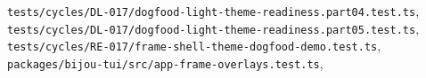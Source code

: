 \begin{itemize}
\texttt{t\allowbreak{}e\allowbreak{}s\allowbreak{}t\allowbreak{}s\allowbreak{}/\allowbreak{}c\allowbreak{}y\allowbreak{}c\allowbreak{}l\allowbreak{}e\allowbreak{}s\allowbreak{}/\allowbreak{}D\allowbreak{}L\allowbreak{}-\allowbreak{}0\allowbreak{}1\allowbreak{}7\allowbreak{}/\allowbreak{}d\allowbreak{}o\allowbreak{}g\allowbreak{}f\allowbreak{}o\allowbreak{}o\allowbreak{}d\allowbreak{}-\allowbreak{}l\allowbreak{}i\allowbreak{}g\allowbreak{}h\allowbreak{}t\allowbreak{}-\allowbreak{}t\allowbreak{}h\allowbreak{}e\allowbreak{}m\allowbreak{}e\allowbreak{}-\allowbreak{}r\allowbreak{}e\allowbreak{}a\allowbreak{}d\allowbreak{}i\allowbreak{}n\allowbreak{}e\allowbreak{}s\allowbreak{}s\allowbreak{}.\allowbreak{}p\allowbreak{}a\allowbreak{}r\allowbreak{}t\allowbreak{}0\allowbreak{}4\allowbreak{}.\allowbreak{}t\allowbreak{}e\allowbreak{}s\allowbreak{}t\allowbreak{}.\allowbreak{}t\allowbreak{}s}, \texttt{t\allowbreak{}e\allowbreak{}s\allowbreak{}t\allowbreak{}s\allowbreak{}/\allowbreak{}c\allowbreak{}y\allowbreak{}c\allowbreak{}l\allowbreak{}e\allowbreak{}s\allowbreak{}/\allowbreak{}D\allowbreak{}L\allowbreak{}-\allowbreak{}0\allowbreak{}1\allowbreak{}7\allowbreak{}/\allowbreak{}d\allowbreak{}o\allowbreak{}g\allowbreak{}f\allowbreak{}o\allowbreak{}o\allowbreak{}d\allowbreak{}-\allowbreak{}l\allowbreak{}i\allowbreak{}g\allowbreak{}h\allowbreak{}t\allowbreak{}-\allowbreak{}t\allowbreak{}h\allowbreak{}e\allowbreak{}m\allowbreak{}e\allowbreak{}-\allowbreak{}r\allowbreak{}e\allowbreak{}a\allowbreak{}d\allowbreak{}i\allowbreak{}n\allowbreak{}e\allowbreak{}s\allowbreak{}s\allowbreak{}.\allowbreak{}p\allowbreak{}a\allowbreak{}r\allowbreak{}t\allowbreak{}0\allowbreak{}5\allowbreak{}.\allowbreak{}t\allowbreak{}e\allowbreak{}s\allowbreak{}t\allowbreak{}.\allowbreak{}t\allowbreak{}s}, \texttt{t\allowbreak{}e\allowbreak{}s\allowbreak{}t\allowbreak{}s\allowbreak{}/\allowbreak{}c\allowbreak{}y\allowbreak{}c\allowbreak{}l\allowbreak{}e\allowbreak{}s\allowbreak{}/\allowbreak{}R\allowbreak{}E\allowbreak{}-\allowbreak{}0\allowbreak{}1\allowbreak{}7\allowbreak{}/\allowbreak{}f\allowbreak{}r\allowbreak{}a\allowbreak{}m\allowbreak{}e\allowbreak{}-\allowbreak{}s\allowbreak{}h\allowbreak{}e\allowbreak{}l\allowbreak{}l\allowbreak{}-\allowbreak{}t\allowbreak{}h\allowbreak{}e\allowbreak{}m\allowbreak{}e\allowbreak{}-\allowbreak{}d\allowbreak{}o\allowbreak{}g\allowbreak{}f\allowbreak{}o\allowbreak{}o\allowbreak{}d\allowbreak{}-\allowbreak{}d\allowbreak{}e\allowbreak{}m\allowbreak{}o\allowbreak{}.\allowbreak{}t\allowbreak{}e\allowbreak{}s\allowbreak{}t\allowbreak{}.\allowbreak{}t\allowbreak{}s}, \texttt{p\allowbreak{}a\allowbreak{}c\allowbreak{}k\allowbreak{}a\allowbreak{}g\allowbreak{}e\allowbreak{}s\allowbreak{}/\allowbreak{}b\allowbreak{}i\allowbreak{}j\allowbreak{}o\allowbreak{}u\allowbreak{}-\allowbreak{}t\allowbreak{}u\allowbreak{}i\allowbreak{}/\allowbreak{}s\allowbreak{}r\allowbreak{}c\allowbreak{}/\allowbreak{}a\allowbreak{}p\allowbreak{}p\allowbreak{}-\allowbreak{}f\allowbreak{}r\allowbreak{}a\allowbreak{}m\allowbreak{}e\allowbreak{}-\allowbreak{}o\allowbreak{}v\allowbreak{}e\allowbreak{}r\allowbreak{}l\allowbreak{}a\allowbreak{}y\allowbreak{}s\allowbreak{}.\allowbreak{}t\allowbreak{}e\allowbreak{}s\allowbreak{}t\allowbreak{}.\allowbreak{}t\allowbreak{}s}, 
\end{itemize}
